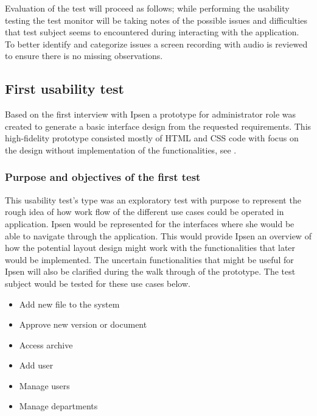Evaluation of the test will proceed as follows; while performing the usability testing the test monitor will be taking notes of the possible issues and difficulties that test subject seems to encountered during interacting with the application.
To better identify and categorize issues a screen recording with audio is reviewed to ensure there is no missing observations.

\subsection{First usability test}\label{firsttest}
Based on the first interview with Ipsen a prototype for administrator role was created to generate a basic interface design from the requested requirements.
This high-fidelity prototype consisted mostly of HTML and CSS code with focus on the design without implementation of the functionalities, see .

\subsubsection*{Purpose and objectives of the first test}
This usability test's type was an exploratory test with purpose to represent the rough idea of how work flow of the different use cases could be operated in application.
Ipsen would be represented for the interfaces where she would be able to navigate through the application.
This would provide Ipsen an overview of how the potential layout design might work with the functionalities that later would be implemented.
The uncertain functionalities that might be useful for Ipsen will also be clarified during the walk through of the prototype.
The test subject would be tested for these use cases below.

\begin{itemize}
	\item Add new file to the system
	\item Approve new version or document
	\item Access archive
	\item Add user
	\item Manage users
	\item Manage departments
\end{itemize}

